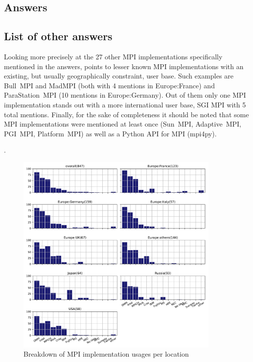 
\subsection{Answers}


\subsection{List of other answers}

Looking more precisely at the 27 other MPI implementations
specifically mentioned in the answers, points to lesser known MPI
implementations with an existing, but usually geographically
constraint, user base. Such examples are Bull~MPI and MadMPI (both
with 4 mentions in Europe:France) and ParaStation~MPI (10 mentions in
Europe:Germany). Out of them only one MPI implementation stands out
with a more international user base, SGI MPI with 5 total
mentions. Finally, for the sake of completeness it should be noted
that some MPI implementations were mentioned at least once (Sun~MPI,
Adaptive~MPI, PGI~MPI, Platform~MPI) as well as a Python API for MPI
(mpi4py). 

.

\begin{report}
\begin{itemize}

\end{itemize}
\end{report}

\begin{figure}[htb]
\begin{center}
\includegraphics[width=10cm]{../pdfs/Q12.pdf}
\caption{Breakdown of MPI implementation usages per location}
\label{fig:Q12}
\end{center}
\end{figure}
